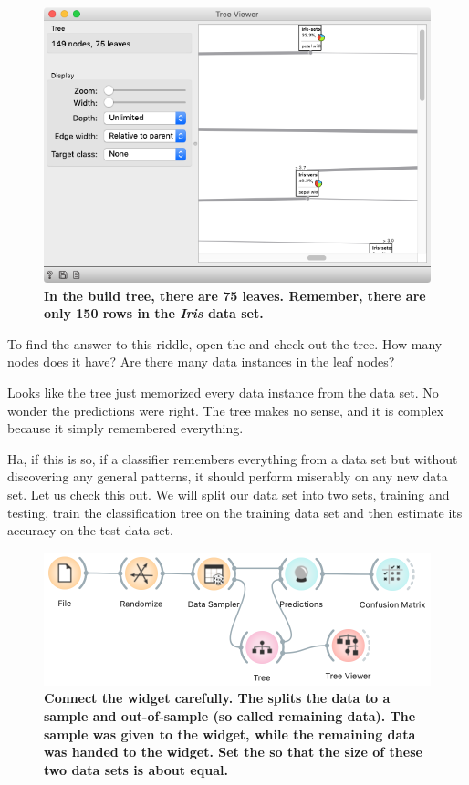 \begin{figure}
    \includegraphics[scale=0.4]{tree_viewer.png}
    \caption{\textbf{\textsf{In the build tree, there are 75 leaves. Remember, there are only 150 rows in the \textit{Iris} data set.}}}
\end{figure}

To find the answer to this riddle, open the  and check out the tree. How many nodes does it have? Are there many data instances in the leaf nodes?

Looks like the tree just memorized every data instance from the data set. No wonder the predictions were right. The tree makes no sense, and it is complex because it simply remembered everything.

Ha, if this is so, if a classifier remembers everything from a data set but without discovering any general patterns, it should perform miserably on any new data set. Let us check this out. We will split our data set into two sets, training and testing, train the classification tree on the training data set and then estimate its accuracy on the test data set.

\begin{figure}[h]
    \includegraphics[scale=0.35]{workflow_data_sampler.png}
    \caption{\textbf{\textsf{Connect the  widget carefully. The  splits the data to a sample and out-of-sample (so called remaining data). The sample was given to the  widget, while the remaining data was handed to the  widget. Set the  so that the size of these two data sets is about equal.}}}
\end{figure}

